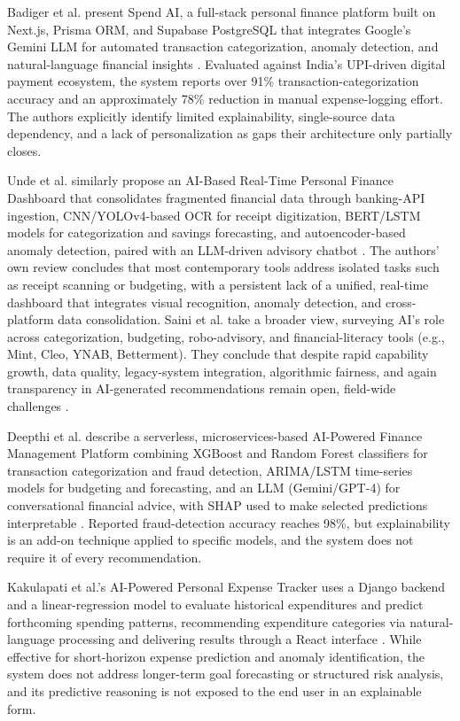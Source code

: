 \documentclass[conference]{IEEEtran}
\begin{document}
Badiger et al. present Spend AI, a full-stack personal finance platform built on Next.js, Prisma ORM, and Supabase PostgreSQL that integrates Google's Gemini LLM for automated transaction categorization, anomaly detection, and natural-language financial insights \cite{badiger2026spendai}. Evaluated against India's UPI-driven digital payment ecosystem, the system reports over 91\% transaction-categorization accuracy and an approximately 78\% reduction in manual expense-logging effort. The authors explicitly identify limited explainability, single-source data dependency, and a lack of personalization as gaps their architecture only partially closes.

Unde et al. similarly propose an AI-Based Real-Time Personal Finance Dashboard that consolidates fragmented financial data through banking-API ingestion, CNN/YOLOv4-based OCR for receipt digitization, BERT/LSTM models for categorization and savings forecasting, and autoencoder-based anomaly detection, paired with an LLM-driven advisory chatbot \cite{unde2026dashboard}. The authors' own review concludes that most contemporary tools address isolated tasks such as receipt scanning or budgeting, with a persistent lack of a unified, real-time dashboard that integrates visual recognition, anomaly detection, and cross-platform data consolidation. Saini et al. take a broader view, surveying AI's role across categorization, budgeting, robo-advisory, and financial-literacy tools (e.g., Mint, Cleo, YNAB, Betterment). They conclude that despite rapid capability growth, data quality, legacy-system integration, algorithmic fairness, and again transparency in AI-generated recommendations remain open, field-wide challenges \cite{saini2025aipowered}.

Deepthi et al. describe a serverless, microservices-based AI-Powered Finance Management Platform combining XGBoost and Random Forest classifiers for transaction categorization and fraud detection, ARIMA/LSTM time-series models for budgeting and forecasting, and an LLM (Gemini/GPT-4) for conversational financial advice, with SHAP used to make selected predictions interpretable \cite{deepthi2026aipowered}. Reported fraud-detection accuracy reaches 98\%, but explainability is an add-on technique applied to specific models, and the system does not require it of every recommendation.

Kakulapati et al.'s AI-Powered Personal Expense Tracker uses a Django backend and a linear-regression model to evaluate historical expenditures and predict forthcoming spending patterns, recommending expenditure categories via natural-language processing and delivering results through a React interface \cite{kakulapati2026expensetracker}. While effective for short-horizon expense prediction and anomaly identification, the system does not address longer-term goal forecasting or structured risk analysis, and its predictive reasoning is not exposed to the end user in an explainable form.
\end{document}
